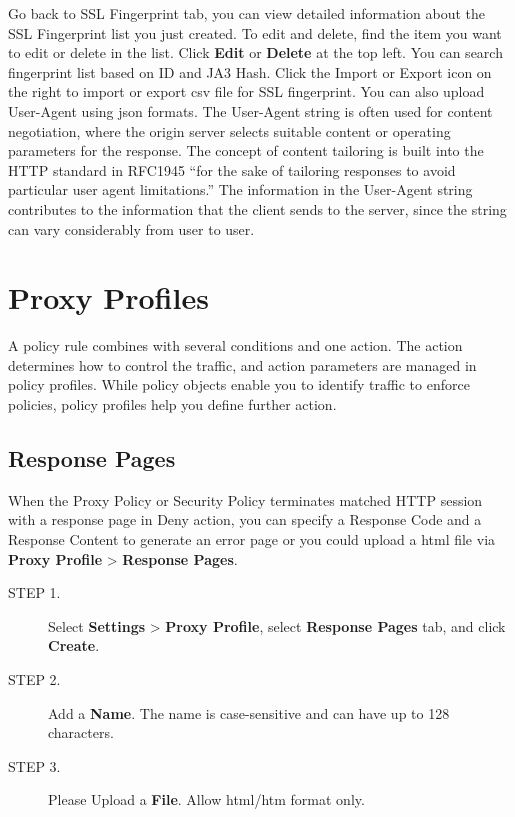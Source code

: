 Go back to SSL Fingerprint tab, you can view detailed information about the SSL Fingerprint list you just created. 
To edit and delete, find the item you want to edit or delete in the list. Click \textbf{Edit} or \textbf{Delete} at the top left. 
You can search fingerprint list based on ID and JA3 Hash. Click the Import or Export icon on the right to import or export csv file for SSL fingerprint. 
You can also upload User-Agent using json formats. The User-Agent string is often used for content negotiation, 
where the origin server selects suitable content or operating parameters for the response. 
The concept of content tailoring is built into the HTTP standard in RFC1945 “for the sake of tailoring responses to avoid particular user agent limitations.” 
The information in the User-Agent string contributes to the information that the client sends to the server, since the string can vary considerably from user to user.

\section*{\hypertarget{link:Proxy Profiles}{Proxy Profiles}}
\label{sec:decrypt:profile}

A policy rule combines with several conditions and one action. The action determines how to control the traffic, and action parameters are managed in policy profiles. 
While policy objects enable you to identify traffic to enforce policies, policy profiles help you define further action.

\subsection*{\hypertarget{link:Response Pages}{Response Pages}}
\label{sec:decrypt:profile:response}

When the Proxy Policy or Security Policy terminates matched HTTP session with a response page in Deny action, 
you can specify a Response Code and a Response Content to generate an error page 
or you could upload a html file via \textbf{Proxy Profile} > \textbf{Response Pages}.

\begin{description}
    \item[STEP 1.]	Select \textbf{Settings} > \textbf{Proxy Profile}, select \textbf{Response Pages} tab, and click \textbf{Create}.
    \item[STEP 2.]	Add a \textbf{Name}. The name is case-sensitive and can have up to 128 characters.
    \item[STEP 3.]	Please Upload a \textbf{File}. Allow html/htm format only. 
\end{description} 

